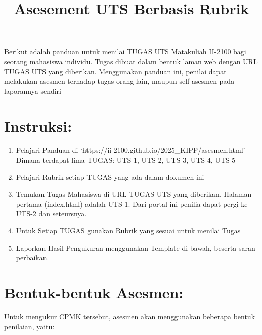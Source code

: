 \documentclass[
  letterpaper,
  DIV=11,
  numbers=noendperiod]{scrreprt}
\title{Asesement UTS Berbasis Rubrik}
\author{}
\date{}
\providecommand{\tightlist}{%
  \setlength{\itemsep}{0pt}\setlength{\parskip}{0pt}}
\begin{document}
\maketitle


Berikut adalah panduan untuk menilai TUGAS UTS Matakuliah II-2100 bagi
seorang mahasiswa individu. Tugas dibuat dalam bentuk laman web dengan
URL TUGAS UTS yang diberikan. Menggunakan panduan ini, penilai dapat
melakukan asesmen terhadap tugas orang lain, maupun self asesmen pada
laporannya sendiri

\chapter{Instruksi:}\label{instruksi}

\begin{enumerate}
\def\labelenumi{\arabic{enumi}.}
\tightlist
\item
  Pelajari Panduan di
  `https://ii-2100.github.io/2025\_KIPP/asesmen.html' Dimana terdapat
  lima TUGAS: UTS-1, UTS-2, UTS-3, UTS-4, UTS-5
\item
  Pelajari Rubrik setiap TUGAS yang ada dalam dokumen ini
\item
  Temukan Tugas Mahasiswa di URL TUGAS UTS yang diberikan. Halaman
  pertama (index.html) adalah UTS-1. Dari portal ini penilia dapat pergi
  ke UTS-2 dan seteursnya.
\item
  Untuk Setiap TUGAS gunakan Rubrik yang sesuai untuk menilai Tugas
\item
  Laporkan Hasil Pengukuran menggunakan Template di bawah, beserta saran
  perbaikan.
\end{enumerate}

\chapter{\texorpdfstring{\textbf{Bentuk-bentuk
Asesmen:}}{Bentuk-bentuk Asesmen:}}\label{bentuk-bentuk-asesmen}

Untuk mengukur CPMK tersebut, asesmen akan menggunakan beberapa bentuk
penilaian, yaitu:
\end{document}
